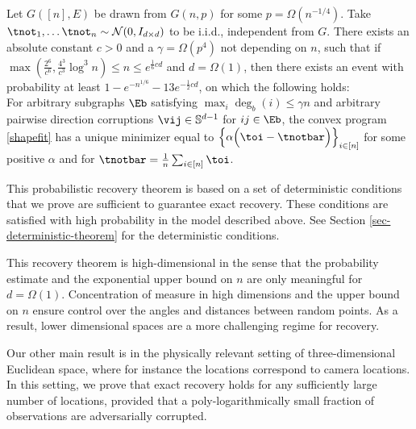 \begin{theorem} \label{thm-complete}
Let $G([n],E)$ be drawn from $G(n,p)$ for some $p = \Omega(n^{-1/4})$. Take $ \tnot_1, \ldots \tnot_n \sim \mathcal{N}(0, I_{d \times d})$ to be i.i.d., independent from $G$. There exists an absolute constant $c>0$ and a $\gamma = \Omega(p^4)$ not depending on $n$, such that if $\max(\frac{2^6}{c^6}, \frac{4^3}{c^3} \log^3 n) \leq  n \leq e^{\frac{1}{6}c d}$ and $d = \Omega(1)$, then there exists an event with probability at least  $1- e^{-n^{1/6}} - 13 e^{-\frac{1}{2}c d}$, on which the following holds:\\[1em]
For arbitrary  subgraphs $\Eb$ satisfying $\max_i \deg_b(i) \leq \gamma n$ and arbitrary pairwise direction corruptions  $\vij \in \mathbb{S}^{d-1}$ for $ij \in \Eb$,  the convex program \eqref{shapefit} has a unique minimizer equal to $\left \{\alpha \Bigl(\toi - \tnotbar \Bigr)\right\}_{i \in [n]}$ for some positive $\alpha$ and for $\tnotbar = \frac{1}{n}\sum_{i\in [n]} \toi$. 
\end{theorem}

This probabilistic recovery theorem is based on a set of deterministic conditions that we prove are sufficient to guarantee exact recovery.  These conditions are satisfied with high probability in the model described above.  See Section \ref{sec-deterministic-theorem} for the deterministic conditions.


This recovery theorem is high-dimensional in the sense that the probability estimate and the exponential upper bound on $n$ are only meaningful for $d= \Omega(1)$.  Concentration of measure  in high dimensions and the upper bound on $n$ ensure control over the angles and distances between random points. As a result, lower dimensional spaces are a more challenging regime for recovery.  

Our other main result is in the physically relevant setting of three-dimensional Euclidean space, where for instance the locations correspond to camera locations.  In this setting, we prove that exact recovery holds for any sufficiently large number of locations, provided that a poly-logarithmically small fraction of observations are adversarially corrupted.


